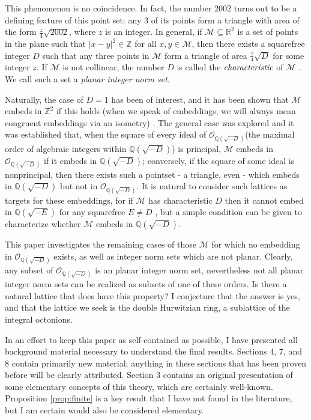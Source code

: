 \documentclass[10pt]{amsart}
\newcommand{\M}{\mathcal{M}}
\newcommand{\Q}{\mathbb{Q}}
\newcommand{\Z}{\mathbb{Z}}
\newcommand{\R}{\mathbb{R}}
\newcommand{\thefield}{\Q(\sqrt{-D})}
\newcommand{\thering}{\mathcal{O}_{\Q(\sqrt{-D})}}
\begin{document}
This phenomenon is no coincidence.  In fact, the number $2002$ turns out to be a defining feature of this point set: any $3$ of its points form a triangle with area of the form $\frac{z}{4}\sqrt{2002}$, where $z$ is an integer.  In general, if $\M \subseteq \R^2$ is a set of points in the plane such that $|x-y|^2 \in \Z$ for all $x,y \in \M$, then there exists a squarefree integer $D$ such that any three points in $\M$ form a triangle of area $\frac{z}{4}\sqrt{D}$ for some integer $z$.  If $\M$ is not collinear, the number $D$ is called the $\emph{characteristic}$ of $\M$ \cite{Kr08}.  We call such a set a \emph{planar integer norm set}.

Naturally, the case of $D=1$ has been of interest, and it has been shown that $\M$ embeds in $\Z^2$ if this holds (when we speak of embeddings, we will always mean congruent embeddings via an isometry) \cite{Yi17,Fr01,Lu12,Ma13}.  The general case was explored and it was established that, when the square of every ideal of $\thering$(the maximal order of algebraic integers within $\Q(\sqrt{-D})$) is principal, $\M$ embeds in $\thering$ if it embeds in $\thefield$; conversely, if the square of some ideal is nonprincipal, then there exists such a pointset - a triangle, even - which embeds in $\thefield$ but not in $\thering$.  It is natural to consider such lattices as targets for these embeddings, for if $\M$ has characteristic $D$ then it cannot embed in $\Q(\sqrt{-E})$ for any squarefree $E \neq D$ \cite{Kn15}, but a simple condition can be given to characterize whether $\M$ embeds in $\Q(\sqrt{-D})$.

This paper investigates the remaining cases of those $\M$ for which no embedding in $\thering$ exists, as well as integer norm sets which are not planar.  Clearly, any subset of $\thering$ is an planar integer norm set, nevertheless not all planar integer norm sets can be realized as subsets of one of these orders.  Is there a natural lattice that does have this property?  I conjecture that the answer is yes, and that the lattice we seek is the double Hurwitzian ring, a sublattice of the integral octonions.

In an effort to keep this paper as self-contained as possible, I have presented all background material necessary to understand the final results.  Sections 4, 7, and 8 contain primarily new material; anything in these sections that has been proven before will be clearly attributed.  Section 3 contains an original presentation of some elementary concepts of this theory, which are certainly well-known.  Proposition \ref{prop:finite} is a key result that I have not found in the literature, but I am certain would also be considered elementary.
\end{document}
